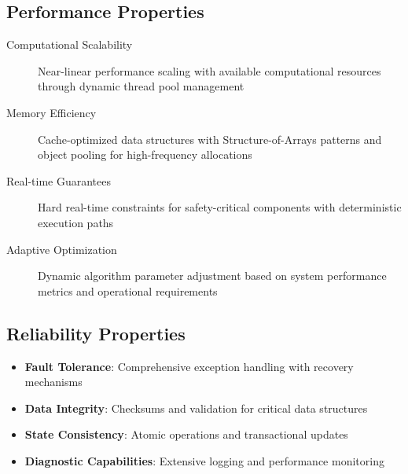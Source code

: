 \subsection{Performance Properties}

\begin{description}
    \item[Computational Scalability] Near-linear performance scaling with available computational resources through dynamic thread pool management
    
    \item[Memory Efficiency] Cache-optimized data structures with Structure-of-Arrays patterns and object pooling for high-frequency allocations
    
    \item[Real-time Guarantees] Hard real-time constraints for safety-critical components with deterministic execution paths
    
    \item[Adaptive Optimization] Dynamic algorithm parameter adjustment based on system performance metrics and operational requirements
\end{description}

\subsection{Reliability Properties}

\begin{itemize}
    \item \textbf{Fault Tolerance}: Comprehensive exception handling with recovery mechanisms
    \item \textbf{Data Integrity}: Checksums and validation for critical data structures
    \item \textbf{State Consistency}: Atomic operations and transactional updates
    \item \textbf{Diagnostic Capabilities}: Extensive logging and performance monitoring
\end{itemize}
